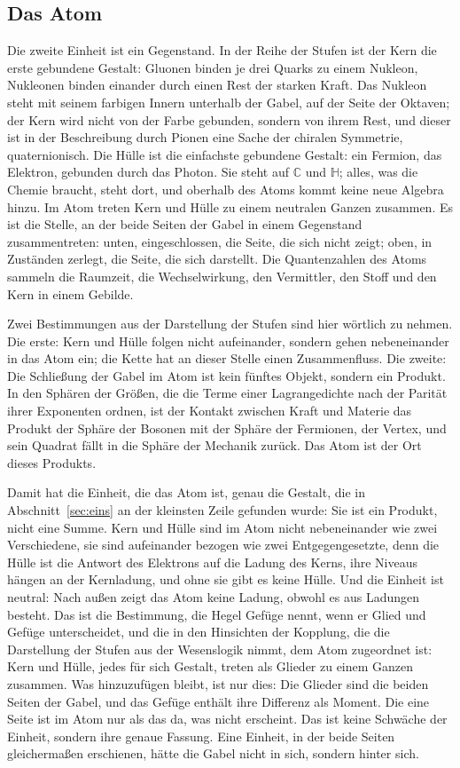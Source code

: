 \documentclass[11pt,a4paper]{article}
\newcommand{\Randlesart}{\marginpar{\raggedright\footnotesize\textcolor{lesart}{$\bigcirc$\,Lesart}}}
\newcommand{\C}{\mathbb C}
\newcommand{\HH}{\mathbb H}
\begin{document}
\subsection{Das Atom}

Die zweite Einheit ist ein Gegenstand. In der Reihe der Stufen ist der Kern die erste gebundene Gestalt: Gluonen binden je drei Quarks zu einem Nukleon, Nukleonen binden einander durch einen Rest der starken Kraft. Das Nukleon steht mit seinem farbigen Innern unterhalb der Gabel, auf der Seite der Oktaven; der Kern wird nicht von der Farbe gebunden, sondern von ihrem Rest, und dieser ist in der Beschreibung durch Pionen eine Sache der chiralen Symmetrie, quaternionisch. Die Hülle ist die einfachste gebundene Gestalt: ein Fermion, das Elektron, gebunden durch das Photon. Sie steht auf $\C$ und $\HH$; alles, was die Chemie braucht, steht dort, und oberhalb des Atoms kommt keine neue Algebra hinzu. Im Atom treten Kern und Hülle zu einem neutralen Ganzen zusammen. Es ist die Stelle, an der beide Seiten der Gabel in einem Gegenstand zusammentreten: unten, eingeschlossen, die Seite, die sich nicht zeigt; oben, in Zuständen zerlegt, die Seite, die sich darstellt. Die Quantenzahlen des Atoms sammeln die Raumzeit, die Wechselwirkung, den Vermittler, den Stoff und den Kern in einem Gebilde.

Zwei Bestimmungen aus der Darstellung der Stufen sind hier wörtlich zu nehmen. Die erste: Kern und Hülle folgen nicht aufeinander, sondern gehen nebeneinander in das Atom ein; die Kette hat an dieser Stelle einen Zusammenfluss. Die zweite: Die Schließung der Gabel im Atom ist kein fünftes Objekt, sondern ein Produkt. In den Sphären der Größen, die die Terme einer Lagrangedichte nach der Parität ihrer Exponenten ordnen, ist der Kontakt zwischen Kraft und Materie das Produkt der Sphäre der Bosonen mit der Sphäre der Fermionen, der Vertex, und sein Quadrat fällt in die Sphäre der Mechanik zurück. Das Atom ist der Ort dieses Produkts.

\Randlesart Damit hat die Einheit, die das Atom ist, genau die Gestalt, die in Abschnitt~\ref{sec:eins} an der kleinsten Zeile gefunden wurde: Sie ist ein Produkt, nicht eine Summe. Kern und Hülle sind im Atom nicht nebeneinander wie zwei Verschiedene, sie sind aufeinander bezogen wie zwei Entgegengesetzte, denn die Hülle ist die Antwort des Elektrons auf die Ladung des Kerns, ihre Niveaus hängen an der Kernladung, und ohne sie gibt es keine Hülle. Und die Einheit ist neutral: Nach außen zeigt das Atom keine Ladung, obwohl es aus Ladungen besteht. Das ist die Bestimmung, die Hegel Gefüge nennt, wenn er Glied und Gefüge unterscheidet, und die in den Hinsichten der Kopplung, die die Darstellung der Stufen aus der Wesenslogik nimmt, dem Atom zugeordnet ist: Kern und Hülle, jedes für sich Gestalt, treten als Glieder zu einem Ganzen zusammen. Was hinzuzufügen bleibt, ist nur dies: Die Glieder sind die beiden Seiten der Gabel, und das Gefüge enthält ihre Differenz als Moment. Die eine Seite ist im Atom nur als das da, was nicht erscheint. Das ist keine Schwäche der Einheit, sondern ihre genaue Fassung. Eine Einheit, in der beide Seiten gleichermaßen erschienen, hätte die Gabel nicht in sich, sondern hinter sich.
\end{document}
